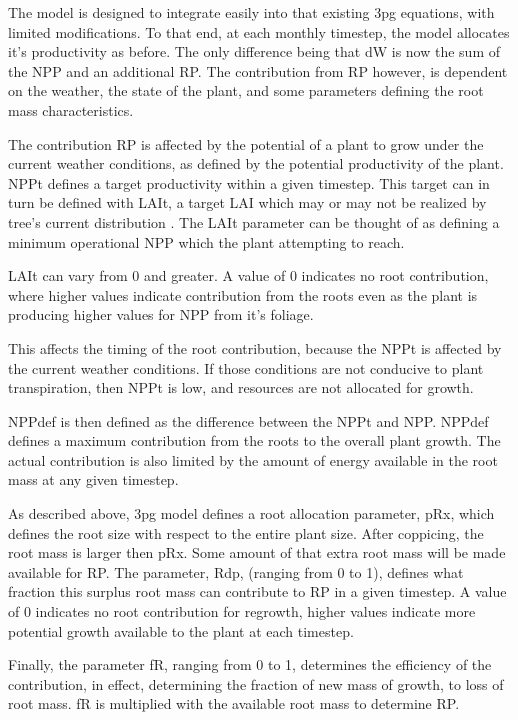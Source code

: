 \documentclass[10pt]{article}
\begin{document}
The model is designed to integrate easily into that existing \ac{3pg}
equations, with limited modifications.  To that end, at each monthly
timestep, the model allocates it's productivity as before.  The only
difference being that \acf{dW} is now the sum of the \acf{NPP} and an
additional \acf{RP}.  The contribution from \ac{RP} however, is
dependent on the weather, the state of the plant, and some parameters
defining the root mass characteristics. 

The contribution \ac{RP} is affected by the potential of a plant to
grow under the current weather conditions, as defined by the potential
productivity of the plant.  \ac{NPPt} defines a target productivity
within a given timestep.  This target can in turn be defined with
\acs{LAIt}, a target \ac{LAI} which may or may not be realized by
tree's current distribution .  The \acs{LAIt} parameter can be thought
of as defining a minimum operational \acs{NPP} which the plant
attempting to reach.

\acs{LAIt} can vary from 0 and greater.  A value of 0 indicates no
root contribution, where higher values indicate contribution from the
roots even as the plant is producing higher values for \acs{NPP} from
it's foliage.

This affects the timing of the root contribution, because the
\ac{NPPt} is affected by the current weather conditions.  If those
conditions are not conducive to plant transpiration, then \ac{NPPt}
is low, and resources are not allocated for growth.

\ac{NPPdef} is then defined as the difference between the \ac{NPPt}
and \ac{NPP}. \ac{NPPdef} defines a maximum contribution from the
roots to the overall plant growth.  The actual contribution is also
limited by the amount of energy available in the root mass at any
given timestep.

As described above, \ac{3pg} model defines a root allocation
parameter, \acs{pRx}, which defines the root size with respect to the
entire plant size.  After coppicing, the root mass is larger then
\acs{pRx}.  Some amount of that extra root mass will be made available
for \ac{RP}.  The parameter, \ac{Rdp}, (ranging from 0 to 1), defines
what fraction this surplus root mass can contribute to \ac{RP} in a
given timestep.  A value of 0 indicates no root contribution for
regrowth, higher values indicate more potential growth available to
the plant at each timestep.

Finally, the parameter \acf{fR}, ranging from 0 to 1, determines the
efficiency of the contribution, in effect, determining the fraction of
new mass of growth, to loss of root mass.  \acs{fR} is multiplied with
the available root mass to determine \ac{RP}.
\end{document}
